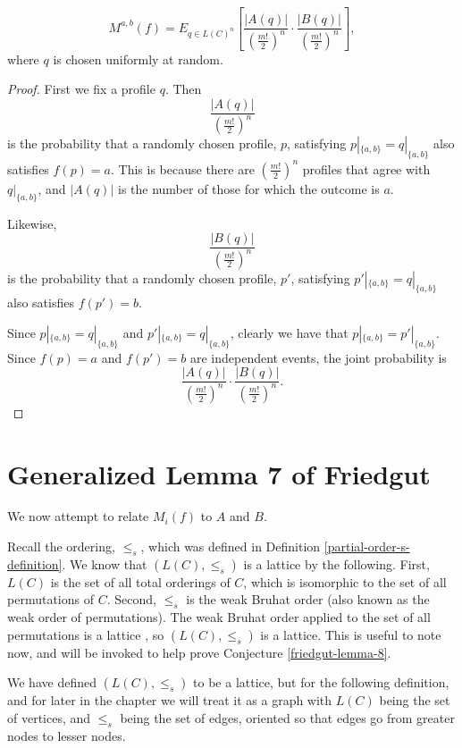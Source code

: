 	\begin{lemma}
		\label{friedgut-lemma-6}
		\[
			M^{a,b}(f) = E_{q \in L(C)^n} \left[ \frac{|A(q)|}{\left(\frac{m!}{2}\right)^n} \cdot \frac{|B(q)|}{\left(\frac{m!}{2}\right)^n} \right],
		\]
		where $q$ is chosen uniformly at random.
	\end{lemma}
	\begin{proof}
		First we fix a profile $q$. Then
		\[
			\frac{|A(q)|}{\left(\frac{m!}{2}\right)^n}
		\]
		is the probability that a randomly chosen profile, $p$, satisfying $p|_{\{a,b\}} = q|_{\{a,b\}}$ also satisfies $f(p) = a$. This is because there are $(\frac{m!}{2})^n$ profiles that agree with $q|_{\{a,b\}}$, and $|A(q)|$ is the number of those for which the outcome is $a$.

		Likewise,
		\[
			\frac{|B(q)|}{\left(\frac{m!}{2}\right)^n}
		\]
		is the probability that a randomly chosen profile, $p'$, satisfying $p'|_{\{a,b\}} = q|_{\{a,b\}}$ also satisfies $f(p') = b$.

		Since $p|_{\{a,b\}} = q|_{\{a,b\}}$ and $p'|_{\{a,b\}} = q|_{\{a,b\}}$, clearly we have that $p|_{\{a,b\}} = p'|_{\{a,b\}}$. Since $f(p) = a$ and $f(p') = b$ are independent events, the joint probability is
		\[
			\frac{|A(q)|}{\left(\frac{m!}{2}\right)^n} \cdot \frac{|B(q)|}{\left(\frac{m!}{2}\right)^n}.
		\]
	\end{proof}


\section{Generalized Lemma 7 of Friedgut}

	We now attempt to relate $M_i(f)$ to $A$ and $B$.

	Recall the ordering, $\le_s$, which was defined in Definition \ref{partial-order-s-definition}. We know that $(L(C), \le_s)$ is a lattice by the following. First, $L(C)$ is the set of all total orderings of $C$, which is isomorphic to the set of all permutations of $C$. Second, $\le_s$ is the weak Bruhat order (also known as the weak order of permutations). The weak Bruhat order applied to the set of all permutations is a lattice \cite{bjorner1984orderings}, so $(L(C), \le_s)$ is a lattice. This is useful to note now, and will be invoked to help prove Conjecture \ref{friedgut-lemma-8}.

	We have defined $(L(C), \le_s)$ to be a lattice, but for the following definition, and for later in the chapter we will treat it as a graph with $L(C)$ being the set of vertices, and $\le_s$ being the set of edges, oriented so that edges go from greater nodes to lesser nodes.

